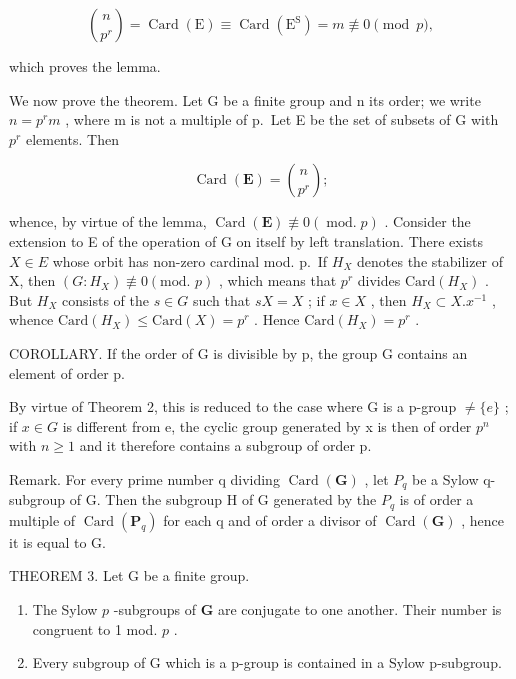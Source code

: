 \[
\binom {n} {p ^ {r}} = \operatorname{Card} (\mathrm{E}) \equiv \operatorname{Card} (\mathrm{E} ^ {\mathrm{S}}) = m \not \equiv 0 \pmod {p},
\]

which proves the lemma.

We now prove the theorem. Let G be a finite group and n its order; we write \(n = p^{r}m\) , where m is not a multiple of p.~Let E be the set of subsets of G with \(p^{r}\) elements. Then

\[
\operatorname{Card} (\mathbf {E}) = \binom{n}{p ^ {r}};
\]

whence, by virtue of the lemma, \(\operatorname{Card}(\mathbf{E}) \not\equiv 0 (\operatorname{mod.} p)\) . Consider the extension to E of the operation of G on itself by left translation. There exists \(X \in E\) whose orbit has non-zero cardinal mod. p.~If \(H_{X}\) denotes the stabilizer of X, then \((G:H_{X}) \not\equiv 0 (\text{mod. } p)\) , which means that \(p^{r}\) divides \(\text{Card}(H_{X})\) . But \(H_{X}\) consists of the \(s \in G\) such that \(sX = X\) ; if \(x \in X\) , then \(H_{X} \subset X.x^{-1}\) , whence \(\text{Card}(H_{X}) \leqslant \text{Card}(X) = p^{r}\) . Hence \(\text{Card}(H_{X}) = p^{r}\) .

COROLLARY. If the order of G is divisible by p, the group G contains an element of order p.

By virtue of Theorem 2, this is reduced to the case where G is a p-group \(\neq\{e\}\) ; if \(x\in G\) is different from e, the cyclic group generated by x is then of order \(p^{n}\) with \(n\geqslant1\) and it therefore contains a subgroup of order p.

Remark. For every prime number q dividing \(\operatorname{Card}(\mathbf{G})\) , let \(P_{q}\) be a Sylow q-subgroup of G. Then the subgroup H of G generated by the \(P_{q}\) is of order a multiple of \(\operatorname{Card}(\mathbf{P}_{q})\) for each q and of order a divisor of \(\operatorname{Card}(\mathbf{G})\) , hence it is equal to G.

THEOREM 3. Let G be a finite group.

\begin{enumerate}
\def\labelenumi{(\alph{enumi})}
\item
  The Sylow \(p\) -subgroups of \(\mathbf{G}\) are conjugate to one another. Their number is congruent to 1 mod. \(p\) .
\item
  Every subgroup of G which is a p-group is contained in a Sylow p-subgroup.
\end{enumerate}


